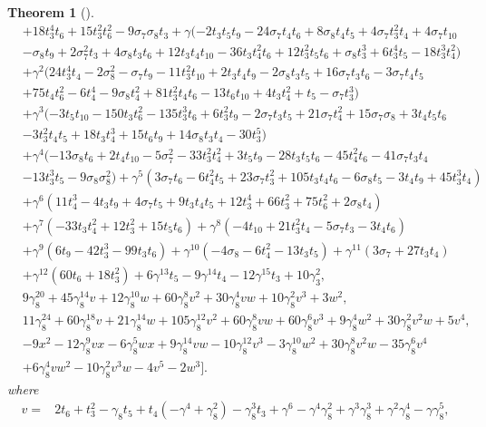 \documentclass{article}
\theoremstyle{plain}
\newtheorem{thm}{Theorem}[section]
\theoremstyle{definition}
\numberwithin{thm}{section}
\begin{document}
\begin{thm}[\cite{nakagawaE8}]
\begin{align*}
					&+18t_3^4t_6+15t_3^2t_6^2-9\sigma_7\sigma_8t_3 
					 +\gamma(-2t_3t_5t_9-24\sigma_7t_4t_6+8\sigma_8t_4t_5+4\sigma_7t_3^2t_4+4\sigma_7t_{10} \\
					&-\sigma_8t_9+2\sigma_7^2t_3+4\sigma_8t_3t_6 
					 +12t_3t_4t_{10}-36t_3t_4^2t_6+12t_3^2t_5t_6+\sigma_8t_3^3+6t_3^4t_5-18t_3^3t_4^2) \\
					&+\gamma^2(24t_3^4t_4-2\sigma_8^2-\sigma_7t_9-11t_3^2t_10+2t_3t_4t_9-2\sigma_8t_3t_5+16\sigma_7t_3t_6-3\sigma_7t_4t_5 \\
					&+75t_4t_6^2-6t_4^4-9\sigma_8t_4^2+81t_3^2t_4t_6-13t_6t_{10}+4t_3t_4^2+t_5-\sigma_7t_3^3) \\
					&+\gamma^3(-3t_5t_{10}-150t_3t_6^2-135t_3^3t_6+6t_3^2t_9-2\sigma_7t_3t_5+21\sigma_7t_4^2+15\sigma_7\sigma_8+3t_4t_5t_6 \\
					&-3t_3^2t_4t_5+18t_3t_4^3+15t_6t_9+14\sigma_8t_3t_4-30t_3^5) \\
					&+\gamma^4(-13\sigma_8t_6+2t_4t_{10}-5\sigma_7^2-33t_3^2t_4^2+3t_5t_9-28t_3t_5t_6-45t_4^2t_6-41\sigma_7t_3t_4 \\
					&-13t_3^3t_5-9\sigma_8\sigma_8^2)
					 +\gamma^5(3\sigma_7t_6-6t_4^2t_5+23\sigma_7t_3^2+105t_3t_4t_6-6\sigma_8t_5-3t_4t_9+45t_3^3t_4) \\ 
					&+\gamma^6(11t_4^3-4t_3t_9+4\sigma_7t_5+9t_3t_4t_5+12t_3^4+66t_3^2+75t_6^2+2\sigma_8t_4) \\ 
					&+\gamma^7(-33t_3t_4^2+12t_3^2+15t_5t_6)
					+\gamma^8(-4t_{10}+21t_3^2t_4-5\sigma_7t_3-3t_4t_6) \\
					&+\gamma^9(6t_9-42t_3^3-99t_3t_6) 
					+\gamma^{10}(-4\sigma_8-6t_4^2-13t_3t_5)
					+\gamma^{11}(3\sigma_7+27t_3t_4) \\
					&+\gamma^{12}(60t_6+18t_3^2) 
					+6\gamma^{13}t_5-9\gamma^{14}t_4-12\gamma^{15}t_3+10\gamma_3^2, \\
				&9\gamma_8^20+45\gamma_8^{14}v+12\gamma_8^{10}w+60\gamma_8^8v^2+30\gamma_8^4vw+10\gamma_8^2v^3+3w^2, \\
				&11\gamma_8^{24}+60\gamma_8^{18}v+21\gamma_8^{14}w+105\gamma_8^12v^2+60\gamma_8^8vw+60\gamma_8^6v^3+9\gamma_8^4w^2+30\gamma_8^2v^2w+5v^4, \\
				&-9x^2-12\gamma_8^9vx-6\gamma_8^5wx+9\gamma_8^{14}vw-10\gamma_8^{12}v^3-3\gamma_8^{10}w^2+30\gamma_8^8v^2w-35\gamma_8^6v^4 \\
					&+6\gamma_8^4vw^2-10\gamma_8^2v^3w-4v^5-2w^3
				].
			\end{align*}
			where
			\begin{align*}
				v=&2t_6+t_3^2-\gamma_8t_5+t_4(-\gamma^4+\gamma_8^2)-\gamma_8^3t_3+\gamma^6-\gamma^4\gamma_8^2+\gamma^3\gamma_8^3+\gamma^2\gamma_8^4-\gamma \gamma_8^5 , \\

\end{align*}
\end{thm}
\end{document}

